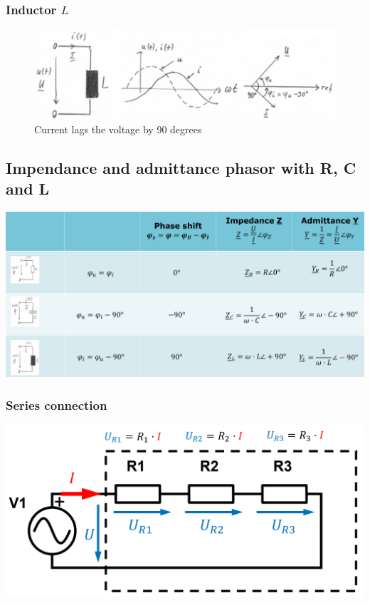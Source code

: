 \documentclass{article}
\begin{document}

\subsubsection{Inductor $L$}


\begin{figure}[ht!]
    \begin{center}
        \includegraphics[width=.6\textwidth]{media/inductive_reactance.png}
        \caption*{Current lags the voltage by 90 degrees}
    \end{center}
\end{figure}

\subsection{Impendance and admittance phasor with R, C and L}
\begin{center}
    \includegraphics[width=\textwidth]{media/impedance_admittance.png}
\end{center}

\subsubsection{Series connection}
\begin{center}
    \includegraphics[width=.5\textwidth]{media/series_resistances.png}
\end{center}
\end{document}

